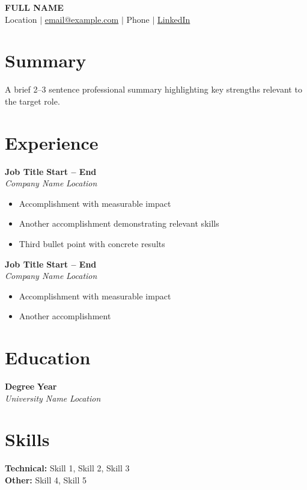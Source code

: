 \documentclass[11pt,letterpaper]{article}
\begin{document}
\begin{center}
  {\LARGE\bfseries FULL NAME} \\[4pt]
  Location \quad $\mid$ \quad
  \href{mailto:email@example.com}{email@example.com} \quad $\mid$ \quad
  Phone \quad $\mid$ \quad
  \href{https://linkedin.com/in/profile}{LinkedIn}
\end{center}

\section{Summary}
A brief 2--3 sentence professional summary highlighting key strengths relevant to the target role.

\section{Experience}

\textbf{Job Title} \hfill \textbf{Start -- End} \\
\textit{Company Name} \hfill \textit{Location}
\begin{itemize}
  \item Accomplishment with measurable impact
  \item Another accomplishment demonstrating relevant skills
  \item Third bullet point with concrete results
\end{itemize}

\vspace{4pt}

\textbf{Job Title} \hfill \textbf{Start -- End} \\
\textit{Company Name} \hfill \textit{Location}
\begin{itemize}
  \item Accomplishment with measurable impact
  \item Another accomplishment
\end{itemize}

\section{Education}

\textbf{Degree} \hfill \textbf{Year} \\
\textit{University Name} \hfill \textit{Location}

\section{Skills}
\textbf{Technical:} Skill 1, Skill 2, Skill 3 \\
\textbf{Other:} Skill 4, Skill 5
\end{document}
